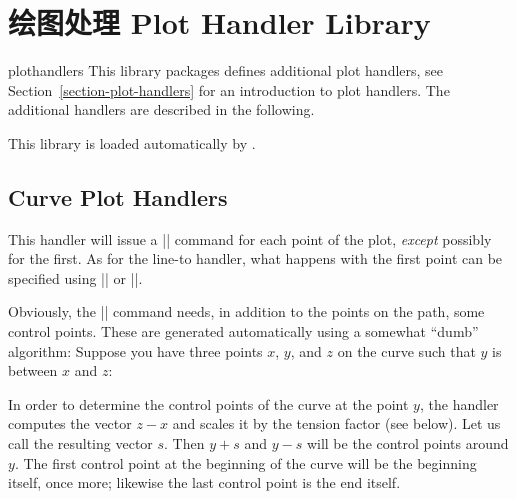 %
%
%


\section{绘图处理 Plot Handler Library}
\label{section-library-plothandlers}

\begin{pgflibrary}{plothandlers}
    This library packages defines additional plot handlers, see
    Section~\ref{section-plot-handlers} for an introduction to plot handlers.
    The additional handlers are described in the following.

    This library is loaded automatically by \tikzname.
\end{pgflibrary}


\subsection{Curve Plot Handlers}

\begin{command}{\pgfplothandlercurveto}
    This handler will issue a |\pgfpathcurveto| command for each point of the
    plot, \emph{except} possibly for the first. As for the line-to handler,
    what happens with the first point can be specified using
    |\pgfsetmovetofirstplotpoint| or |\pgfsetlinetofirstplotpoint|.

    Obviously, the |\pgfpathcurveto| command needs, in addition to the points
    on the path, some control points. These are generated automatically using a
    somewhat ``dumb'' algorithm: Suppose you have three points $x$, $y$, and
    $z$ on the curve such that $y$ is between $x$ and $z$:
\begin{codeexample}[]
\end{codeexample}

    In order to determine the control points of the curve at the point $y$, the
    handler computes the vector $z-x$ and scales it by the tension factor (see
    below). Let us call the resulting vector $s$. Then $y+s$ and $y-s$ will be
    the control points around $y$. The first control point at the beginning of
    the curve will be the beginning itself, once more; likewise the last
    control point is the end itself.
\end{command}

